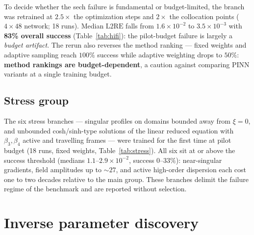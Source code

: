 \documentclass[11pt,a4paper]{article}
\newcommand{\lre}{\mathrm{L2RE}}
\begin{document}
To decide whether the sech failure is fundamental or budget-limited, the
branch was retrained at $2.5\times$ the optimization steps and $2\times$ the
collocation points ($4\times48$ network; 18 runs). Median $\lre$ falls from
$1.6\times10^{-2}$ to $3.5\times10^{-3}$ with \textbf{83\% overall success}
(Table~\ref{tab:hifi}): the pilot-budget failure is largely a \emph{budget
artifact}. The rerun also reverses the method ranking --- fixed weights and
adaptive sampling reach $100\%$ success while adaptive weighting drops to
$50\%$: \textbf{method rankings are budget-dependent}, a caution against
comparing PINN variants at a single training budget.

\begin{table}[htbp]\centering
\caption{High-fidelity sech runs (2500 Adam + 300 L-BFGS steps, 2048 points).}
\label{tab:hifi}
\small

\end{table}

\subsection{Stress group}
\label{sec:stress}

The six stress branches --- singular profiles on domains bounded away from
$\xi=0$, and unbounded cosh/sinh-type solutions of the linear reduced equation
with $\beta_3,\beta_4$ active and travelling frames --- were trained for the
first time at pilot budget (18 runs, fixed weights,
Table~\ref{tab:stress}). All six sit at or above the success threshold
(medians $1.1$--$2.9\times10^{-2}$, success $0$--$33\%$): near-singular
gradients, field amplitudes up to $\sim27$, and active high-order dispersion
each cost one to two decades relative to the main group. These branches
delimit the failure regime of the benchmark and are reported without
selection.

\begin{table}[htbp]\centering
\caption{Stress-group results (fixed weights, 3 seeds per branch).}
\label{tab:stress}
\small

\end{table}

\section{Inverse parameter discovery}
\label{sec:inverse}
\end{document}
